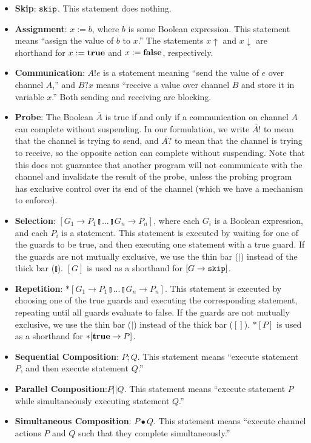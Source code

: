 \documentclass[times, 10pt]{article}
\def\Skip{\hbox{\tt skip}}
\def\true{\hbox{\bf true}}
\def\false{\hbox{\bf false}}
\begin{document}
\begin{itemize}

\item \textbf{Skip}: $\Skip$.  This statement does nothing.

\item \textbf{Assignment}: $x := b$, where $b$ is some Boolean expression.  This
statement means ``assign the value of $b$ to $x$.'' The statements $x\uparrow$
and $x\downarrow$ are shorthand for $x := \true$ and $x := \false$,
respectively.

\item \textbf{Communication}: $A!e$ is a statement meaning ``send the value of
$e$ over channel $A$,'' and $B?x$ means ``receive a value over channel $B$ and
store it in variable $x$.''  Both sending and receiving are blocking.

\item \textbf{Probe}: The Boolean $\overline{A}$ is true if and only if a
communication on channel $A$ can complete without suspending.  In our
formulation, we write $\overline{A!}$ to mean that the channel is trying to
send, and $\overline{A?}$ to mean that the channel is trying to receive, so the
opposite action can complete without suspending.  Note that this does not
guarantee that another program will not communicate with the channel and
invalidate the result of the probe, unless the probing program has exclusive
control over its end of the channel (which we have a mechanism to enforce).

\item \textbf{Selection}: $[G_1 \rightarrow P_1 \talloblong ... \talloblong G_n
\rightarrow P_n]$, where each $G_i$ is a Boolean expression, and each $P_i$ is a
statement.  This statement is executed by waiting for one of the guards to be
true, and then executing one statement with a true guard.  If the guards are not
mutually exclusive, we use the thin bar ($|$) instead of the thick bar
($\talloblong$). $[G]$ is used as a shorthand for $[G \rightarrow \Skip]$.

\item \textbf{Repetition}: $*[G_1 \rightarrow P_1 \talloblong ... \talloblong
G_n \rightarrow P_n]$. This statement is executed by choosing one of the true
guards and executing the corresponding statement, repeating until all guards
evaluate to false. If the guards are not mutually exclusive, we use the thin bar
($|$) instead of the thick bar ($[]$). $*[P]$ is used as a shorthand for
$*[\true \rightarrow P]$.

\item \textbf{Sequential Composition}: $P;Q$.  This statement means ``execute
statement $P$, and then execute statement $Q$.''

\item \textbf{Parallel Composition}:$P || Q$.  This statement means ``execute
statement $P$ while simultaneously executing statement $Q$.''

\item \textbf{Simultaneous Composition}: $P \bullet Q$.  This statement means
``execute channel actions $P$ and $Q$ such that they complete simultaneously.'' 

\end{itemize}
\end{document}
